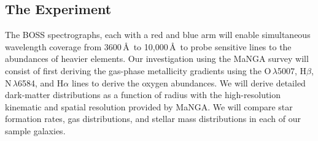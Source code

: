 \documentclass[11pt, a4paper, onecolumn]{article}
\begin{document}
\begin{multicols}{2}

\section{The Experiment}
    The BOSS spectrographs, each with a red and blue arm will enable
    simultaneous wavelength coverage from 3600\,\AA\ to 10,000\,\AA\ to probe
    sensitive lines to the abundances of heavier elements. Our investigation
    using the MaNGA survey will consist of first deriving the gas-phase
    metallicity gradients using the O\iii\,$\lambda$5007, H$\beta$,
    N\ii\,$\lambda$6584, and H$\alpha$ lines to derive the oxygen abundances.
    We will derive detailed dark-matter distributions as a function of radius
    with the high-resolution kinematic and spatial resolution provided by
    MaNGA. We will compare star formation rates, gas distributions, and stellar
    mass distributions in each of our sample galaxies.


\end{multicols}
\end{document}
